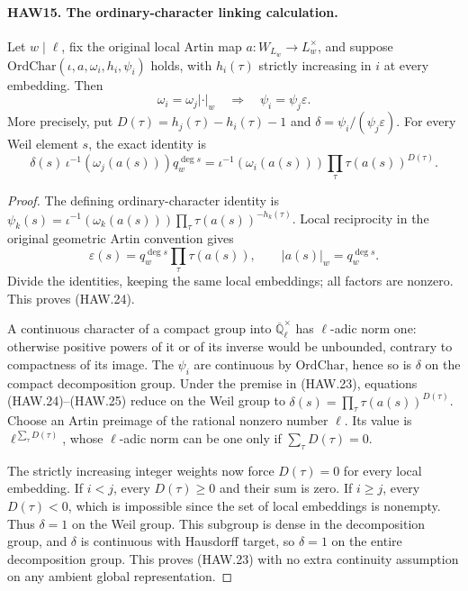 \paragraph{HAW15. The ordinary-character linking calculation.}
\label{claim:HAW15}
Let $w\mid\ell$, fix the original local Artin map
$a:W_{L_w}\to L_w^\times$, and suppose
$\mathrm{OrdChar}(\iota,a,\omega_i,h_i,\psi_i)$ holds,
with $h_i(\tau)$ strictly increasing in $i$ at every
embedding.  Then
\[
          \omega_i=\omega_j|\cdot|_w
                      \quad\Longrightarrow\quad
                         \psi_i=\psi_j\varepsilon.
 \tag{HAW.23}
\]
More precisely, put
$D(\tau)=h_j(\tau)-h_i(\tau)-1$ and
$\delta=\psi_i/(\psi_j\varepsilon)$.  For every Weil
element $s$, the exact identity is
\[
 \delta(s)\,\iota^{-1}(\omega_j(a(s)))q_w^{\deg s}
       =\iota^{-1}(\omega_i(a(s)))
                           \prod_\tau\tau(a(s))^{D(\tau)}.
 \tag{HAW.24}
\]
\begin{proof}
The defining ordinary-character identity is
$\psi_k(s)=\iota^{-1}(\omega_k(a(s)))
\prod_\tau\tau(a(s))^{-h_k(\tau)}$.
Local reciprocity in the original geometric Artin convention
gives
\[
 \varepsilon(s)=q_w^{\deg s}\prod_\tau\tau(a(s)),\qquad
 |a(s)|_w=q_w^{\deg s}.
 \tag{HAW.25}
\]
Divide the identities, keeping the same local embeddings;
all factors are nonzero.  This proves (HAW.24).

A continuous character of a compact group into
$\overline{\mathbb Q}_\ell^\times$ has $\ell$-adic norm
one: otherwise positive powers of it or of its inverse
would be unbounded, contrary to compactness of its image.
The $\psi_i$ are continuous by $\mathrm{OrdChar}$, hence
so is $\delta$ on the compact decomposition group.
Under the premise in (HAW.23), equations (HAW.24)--(HAW.25)
reduce on the Weil group to
$\delta(s)=\prod_\tau\tau(a(s))^{D(\tau)}$.
Choose an Artin preimage of the rational nonzero number
$\ell$.  Its value is $\ell^{\sum_\tau D(\tau)}$,
whose $\ell$-adic norm can be one only if
$\sum_\tau D(\tau)=0$.

The strictly increasing integer weights now force
$D(\tau)=0$ for every local embedding.  If $i<j$, every
$D(\tau)\ge0$ and their sum is zero.  If $i\ge j$,
every $D(\tau)<0$, which is impossible since the set of
local embeddings is nonempty.  Thus $\delta=1$ on the
Weil group.  This subgroup is dense in the decomposition
group, and $\delta$ is continuous with Hausdorff target,
so $\delta=1$ on the entire decomposition group.  This
proves (HAW.23) with no extra continuity assumption on
any ambient global representation.
\end{proof}

